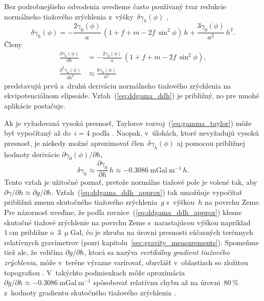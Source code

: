 \documentclass[a4paper, 12pt]{book}
\begin{document}
Bez podrobnejšieho odvodenia uvedieme často používaný tvar redukcie normálneho 
tiažového zrýchlenia z~výšky~$\delta\gamma_h(\phi)$ \parencite[pozri 
napríklad][]{MoritzPhysicalGeodesy},
%
\begin{equation}
\delta\gamma_h(\phi) = -\frac{2\gamma_0(\phi)}{a} \, (1 + f + m - 2f \, 
\sin^2\phi) \, h + \frac{3\gamma_0(\phi)}{a^2} \, h^2{.}
\end{equation}
%
Členy
%
\begin{align}
\frac{\partial \gamma_0(\phi)}{\partial h} &= -\frac{2\gamma_0(\phi)}{a} \, (1 
+ f + m - 2f \, \sin^2\phi){,}\\
%
%
\label{eq:ddgama_ddh}
\frac{\partial^2 \gamma_0(\phi)}{\partial h^2} &\approx 
\frac{6\gamma_0(\phi)}{a^2}
\end{align}
%
predstavujú prvú a~druhú deriváciu normálneho tiažového zrýchlenia na 
ekvipotenciálnom elipsoide.  Vzťah~(\ref{eq:ddgama_ddh}) je približný, no pre 
mnohé aplikácie postačuje.

Ak je vyžadovaná vysoká presnosť, Taylorov rozvoj~(\ref{eq:gamma_taylor}) môže 
byť vypočítaný až do~$i = 4$ podľa \textcite{Pick2000}.  Naopak, v~úlohách, 
ktoré nevyžadujú vysokú presnosť, je niekedy možné aproximovať 
člen~$\delta\gamma_h(\phi)$ aj pomocou približnej hodnoty derivácie $\partial 
\gamma_0(\phi) \slash \partial h$,
%
\begin{equation}
\label{eq:ddgama_ddh_approx}
\delta\gamma_h \approx \frac{\partial \gamma_0}{\partial h} \, h \approx 
-0.3086 \ \mathrm{mGal} \ \mathrm{m}^{-1} \, h{.}
\end{equation}
%
Tento vzťah je užitočné poznať, pretože normálne tiažové pole je volené tak, 
aby $\partial \gamma \slash \partial h \approx \partial g \slash \partial h$.  
Vzťah~(\ref{eq:ddgama_ddh_approx}) tak umožňuje vypočítať približnú zmenu 
skutočného tiažového zrýchlenia~$g$ s~výškou~$h$ na povrchu Zeme.  Pre 
názornosť uveďme, že podľa rovnice~(\ref{eq:ddgama_ddh_approx}) klesne skutočné 
tiažové zrýchlenie na povrchu Zeme s~narastajúcou výškou napríklad~$1 
\ \mathrm{cm}$ približne o~$3 \ \upmu\mathrm{Gal}$, čo je zhruba na úrovni 
presnosti súčasných terénnych relatívnych gravimetrov (pozri 
kapitolu~\ref{sec:gravity_measurements}).  Spomeňme tiež ale, že veličina 
$\partial g \slash \partial h$, ktorá sa nazýva \emph{vertikálny gradient 
tiažového zrýchlenia}, môže v~teréne výrazne varírovať, obzvlášť v~oblastiach 
so zložitou topografiou \parencite{Zahorec2018}.  V~takýchto podmienkach môže 
aproximácia~$\partial g \slash \partial h \approx -0.3086 \ \mathrm{mGal} 
\ \mathrm{m}^{-1}$ spôsobovať relatívnu chybu až na úrovni~$80\ \%$ z~hodnoty 
gradientu skutočného tiažového zrýchlenia \parencite{Vajda2020a}.
\end{document}
